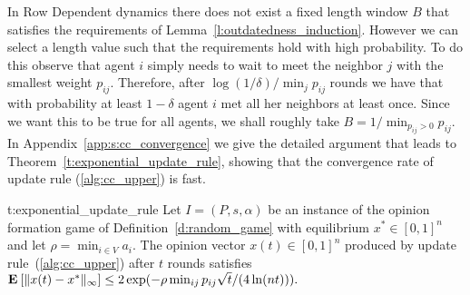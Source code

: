In Row Dependent dynamics there does not exist a fixed length window $B$
that satisfies the requirements of Lemma~\ref{l:outdatedness_induction}.
However we can select a length value such that the requirements hold with high probability.
To do this observe that agent $i$ simply needs to wait to meet the neighbor
$j$ with the smallest weight $p_{ij}$. Therefore, after
$\log(1/\delta)/\min_{j} p_{ij}$ rounds we have that with probability at least
$1-\delta$ agent $i$ met all her neighbors at least once.
Since we want this to be true for all agents,
we shall roughly take $B = 1/\min_{p_{ij} > 0} {p_{ij}}$.
In Appendix~\ref{app:s:cc_convergence} we give the detailed
argument that leads to Theorem~\ref{t:exponential_update_rule},
showing that the convergence rate of update rule (\ref{alg:cc_upper}) is fast.

\begin{reptheorem}{t:exponential_update_rule}
  Let $I = (P,s, \alpha)$ be an instance of the opinion formation
  game of Definition~\ref{d:random_game} with equilibrium
  $x^* \in [0,1]^n$ and let $\rho = \min_{i \in V} a_i$.
  The opinion vector $x(t)\in[0,1]^n$ produced by
  update rule~(\ref{alg:cc_upper}) after $t$ rounds satisfies
  \(
    \Exp{\norm{\infty}{x(t) - x^*}}
    \leq
    2\exp(- \rho  \min_{ij} p_{ij} \sqrt{t}/(4\ln(nt)) ).
  \)
\end{reptheorem}
